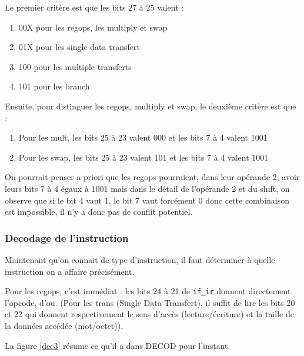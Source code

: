 \documentclass{article}
\begin{document}
Le premier critère est que les bits 27 à 25 valent :
\begin{enumerate}
  \item 00X    pour les regops, les multiply et swap
  \item 01X    pour les single data transfert
  \item 100    pour les multiple transferts
  \item 101    pour les branch
\end{enumerate}

Ensuite, pour distinguer les regops, multiply et swap, le deuxième critère est que :
\begin{enumerate}
  \item Pour les mult, les bits 25 à 23 valent 000 et les bits 7 à 4 valent 1001
  \item Pour les swap, les bits 25 à 23 valent 101 et les bits 7 à 4 valent 1001
\end{enumerate}
On pourrait penser a priori que les regops pourraient, dans leur opérande 2,
avoir leurs bits 7 à 4 égaux à 1001 mais dans le détail de l'opérande 2 et du shift,
on observe que si le bit 4 vaut 1, le bit 7 vaut forcément 0 donc cette combinaison est impossible,
il n'y a donc pas de conflit potentiel.



\subsubsection{Decodage de l'instruction}

Maintenant qu'on connait de type d'instruction, il faut déterminer à quelle instruction
on a affaire précisément.

Pour les regops, c'est immédiat : les bits 24 à 21 de \texttt{if\_ir} donnent directement l'opcode,
d'ou. (Pour les trans (Single Data Transfert), il suffit de lire les bits 20 et 22 qui donnent
respectivement le sens d'accès (lecture/écriture) et la taille de la données accédée (mot/octet)).



La figure \ref{dec3} résume ce qu'il a dans DECOD pour l'instant.
\end{document}

